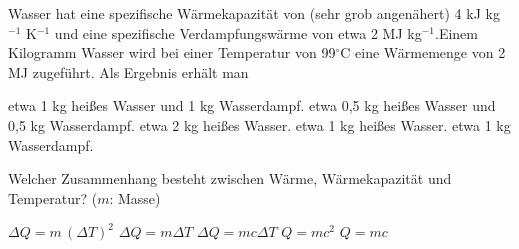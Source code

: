 \documentclass[11pt]{exam}
\begin{document}
\begin{questions}
\vspace{3mm}\question Wasser hat eine spezifische Wärmekapazität von (sehr grob angenähert) 4 kJ kg\(^{-1}\) K\(^{-1}\) und eine spezifische Verdampfungswärme von etwa 2 MJ kg\(^{-1}\).Einem Kilogramm Wasser wird bei einer Temperatur von 99\(^\circ\)C eine Wärmemenge von 2 MJ zugeführt. Als Ergebnis erhält man

\begin{choices}
	\choice etwa 1 kg heißes Wasser und 1 kg Wasserdampf.
	\choice etwa 0,5 kg heißes Wasser und 0,5 kg Wasserdampf.
	\choice etwa 2 kg heißes Wasser.
	\choice etwa 1 kg heißes Wasser.
	\choice etwa 1 kg Wasserdampf.
\end{choices}

\vspace{3mm}\question Welcher Zusammenhang besteht zwischen Wärme, Wärmekapazität und Temperatur? (\(m\): Masse)

\begin{choices}
	\choice \(\Delta Q = m \, (\Delta T)^2\)
	\choice \(\Delta Q = m \Delta T\)
	\choice \(\Delta Q = m c \Delta T\)
	\choice \(Q = m c^2\)
	\choice \(Q = m c\)
\end{choices}

\vspace{3mm}\end{questions}
\end{document}
